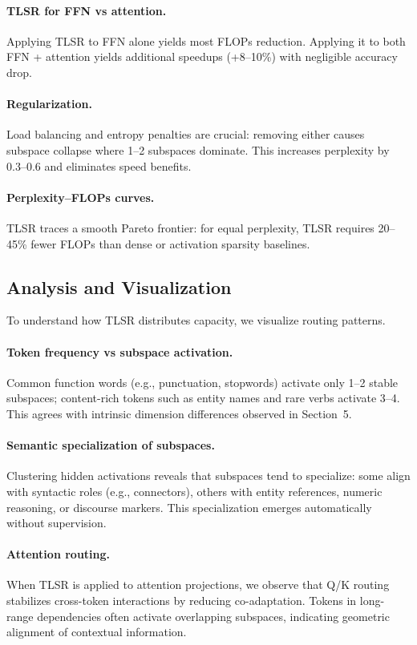 \documentclass{article}
\theoremstyle{plain}
\theoremstyle{definition}
\theoremstyle{remark}
\begin{document}
\paragraph{TLSR for FFN vs attention.}
Applying TLSR to FFN alone yields most FLOPs reduction.
Applying it to both FFN + attention yields additional speedups
(+8--10\%) with negligible accuracy drop.

\paragraph{Regularization.}
Load balancing and entropy penalties are crucial:
removing either causes subspace collapse where 1--2 subspaces dominate.
This increases perplexity by 0.3--0.6 and eliminates speed benefits.

\paragraph{Perplexity--FLOPs curves.}
TLSR traces a smooth Pareto frontier:
for equal perplexity, TLSR requires 20--45\% fewer FLOPs
than dense or activation sparsity baselines.

\subsection{Analysis and Visualization}

To understand how TLSR distributes capacity, we visualize routing patterns.

\paragraph{Token frequency vs subspace activation.}
Common function words (e.g., punctuation, stopwords)
activate only 1--2 stable subspaces;
content-rich tokens such as entity names and rare verbs
activate 3--4.
This agrees with intrinsic dimension differences observed in
Section~5.

\paragraph{Semantic specialization of subspaces.}
Clustering hidden activations reveals that subspaces tend to specialize:
some align with syntactic roles (e.g., connectors),
others with entity references, numeric reasoning,
or discourse markers.
This specialization emerges automatically without supervision.

\paragraph{Attention routing.}
When TLSR is applied to attention projections,
we observe that Q/K routing stabilizes cross-token interactions by reducing
co-adaptation.
Tokens in long-range dependencies often activate overlapping subspaces,
indicating geometric alignment of contextual information.
\end{document}
